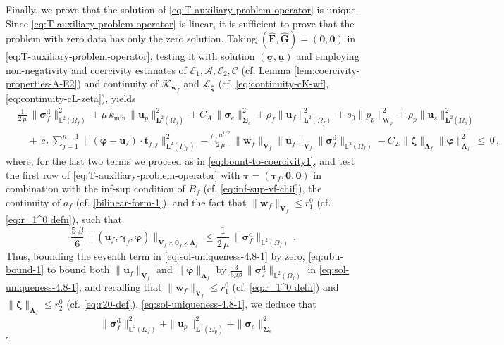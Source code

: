 \documentclass[11pt]{article}
\numberwithin{equation}{section}
\newcommand{\bgamma}{{\boldsymbol\gamma}}
\newcommand{\bLambda}{{\boldsymbol\Lambda}}
\newcommand{\bsi}{{\boldsymbol\sigma}}
\newcommand{\bSigma}{{\boldsymbol\Sigma}}
\newcommand{\bvarphi}{{\boldsymbol\varphi}}
\newcommand{\btau}{{\boldsymbol\tau}}
\newcommand{\bzeta}{{\boldsymbol\zeta}}
\newcommand{\ubsi}{\underline{\bsi}}
\newcommand{\ubtau}{\underline{\btau}}
\newcommand{\ubu}{\underline{\bu}}
\newcommand{\bw}{{\mathbf{w}}}
\newcommand{\bu}{\mathbf{u}}
\newcommand{\bt}{{\mathbf{t}}}
\newcommand{\0}{{\mathbf{0}}}
\def\bF{\mathbf{F}}
\def\bG{\mathbf{G}}
\def\bV{\mathbf{V}}
\newcommand{\bL}{\mathbf{L}}
\newcommand\bbQ{\mathbb{Q}}
\newcommand\bbL{\mathbb{L}}
\newcommand{\cA}{\mathcal{A}}
\newcommand{\cC}{\mathcal{C}}
\newcommand{\cE}{\mathcal{E}}
\newcommand{\cK}{\mathcal{K}}
\newcommand{\cL}{\mathcal{L}}
\def\L{\mathrm{L}}
\def\W{\mathrm{W}}
\def\rd{\mathrm{d}}
\def\wh{\widehat}
\newenvironment{proof}{\noindent{\it Proof.}}{\hfill$\square$}
\numberwithin{equation}{section}
\begin{document}
\begin{proof}
Finally, we prove that the solution of \eqref{eq:T-auxiliary-problem-operator} is unique. Since \eqref{eq:T-auxiliary-problem-operator} is linear, it is sufficient to prove that the problem with zero data has only the zero solution. 
Taking $(\wh{\bF},\wh{\bG}) = (\0,\0) $ in \eqref{eq:T-auxiliary-problem-operator}, testing it with solution $(\ubsi,\ubu)$ and employing non-negativity and coercivity estimates of $\cE_1, \cA,\cE_2, \cC$ (cf. Lemma \ref{lem:coercivity-properties-A-E2}) and continuity of $\cK_{\bw_f}$ and $\cL_{\bzeta}$ (cf. \eqref{eq:continuity-cK-wf}, \eqref{eq:continuity-cL-zeta}), yields 
\begin{align}
&\frac{1}{2\,\mu}\,\| \bsi^\rd_f\|^2_{\bbL^2(\Omega_f)} 
+ \mu\,k_{\min}\,\|\bu_p\|^2_{\bL^2(\Omega_p)} 
+ C_A\,\|\bsi_e\|^2_{\bSigma_e} 
+ \rho_f \|\bu_f\|^2_{\bL^2(\Omega_f)} 
+ s_0\|p_p\|^2_{\W_p}
+ \rho_p\|\bu_s\|^2_{\bL^2(\Omega_p)}
\nonumber \\
&\quad +\, c_I\,\sum^{n-1}_{j=1} \|( \bvarphi-\bu_s)\cdot\bt_{f,j}\|^2_{\L^2(\Gamma_{fp})}
- \frac{\rho_f\,n^{1/2}}{2\,\mu}\,\|\bw_f\|_{\bV_f}\|\bu_f\|_{\bV_f}\|\bsi^\rd_f\|_{\bbL^2(\Omega_f)}
- C_{\cL}\|\bzeta\|_{\bLambda_f}\|\bvarphi\|^2_{\bLambda_f} \,\leq\, 0 \,,
\label{eq:sol-uniqueness-4.8-1}
\end{align}
where, for the last two terms we proceed as in \eqref{eq:bount-to-coercivity1}, and test 
the first row of \eqref{eq:T-auxiliary-problem-operator} with $\ubtau=(\btau_f, \0, \0)$ in combination with the inf-sup condition of $B_f$ (cf. \eqref{eq:inf-sup-vf-chif}), the continuity of $a_f$ (cf. \eqref{bilinear-form-1}), and the fact that $\|\bw_f\|_{\bV_f}\leq r_1^0$ (cf. \eqref{eq:r_1^0 defn}), such that
\begin{equation}\label{eq:ubu-bound-1}
\frac{5\,\beta}{6}\,\|(\bu_f, \bgamma_f, \bvarphi)\|_{\bV_f\times \bbQ_f\times \bLambda_f}
\,\leq \frac{1}{2\,\mu}\,\| \bsi^\rd_f \|_{\bbL^2(\Omega_f)}\,.
\end{equation}
Thus, bounding the seventh term in \eqref{eq:sol-uniqueness-4.8-1} by zero, \eqref{eq:ubu-bound-1} to bound both 
$\|\bu_f\|_{\bV_f}$ and $\|\bvarphi\|_{\bLambda_f}$ by $\frac{3}{5\mu\beta}\,\| \bsi^\rd_f\|_{\bbL^2(\Omega_f)}$ in \eqref{eq:sol-uniqueness-4.8-1}, and recalling that $\|\bw_f\|_{\bV_f}\leq r_1^0$  (cf. \eqref{eq:r_1^0 defn}) and $\|\bzeta\|_{\bLambda_f} \leq r_2^0$ (cf. \eqref{eq:r20-def}), \eqref{eq:sol-uniqueness-4.8-1}, we deduce that
\begin{align*}
&\| \bsi^\rd_f\|^2_{\bbL^2(\Omega_f)} 
+ \|\bu_p\|^2_{\bL^2(\Omega_p)} 
+ \|\bsi_e\|^2_{\bSigma_e}

\end{align*}
\end{proof}
\end{document}
